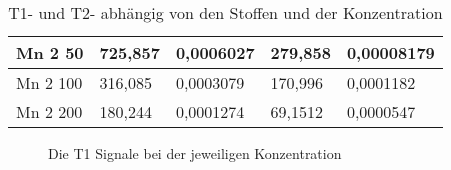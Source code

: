 \begin{table}[H]
\begin{tabular}{lllll}
    \multicolumn{1}{|l|}{Mn 2 50}     & \multicolumn{1}{l|}{725,857} & \multicolumn{1}{l|}{0,0006027} & \multicolumn{1}{l|}{279,858} & \multicolumn{1}{l|}{0,00008179} \\ \hline
    \multicolumn{1}{|l|}{Mn 2 100}    & \multicolumn{1}{l|}{316,085} & \multicolumn{1}{l|}{0,0003079} & \multicolumn{1}{l|}{170,996} & \multicolumn{1}{l|}{0,0001182}  \\ \hline
    \multicolumn{1}{|l|}{Mn 2 200}    & \multicolumn{1}{l|}{180,244} & \multicolumn{1}{l|}{0,0001274} & \multicolumn{1}{l|}{69,1512} & \multicolumn{1}{l|}{0,0000547}  \\ \hline
    \end{tabular}
    \caption{T1- und T2- abhängig von den Stoffen und der Konzentration}
     \end{table}

    \begin{figure}[H]
        \centering
        
        \caption{Die T1 Signale bei der jeweiligen Konzentration}
    \end{figure}
    
